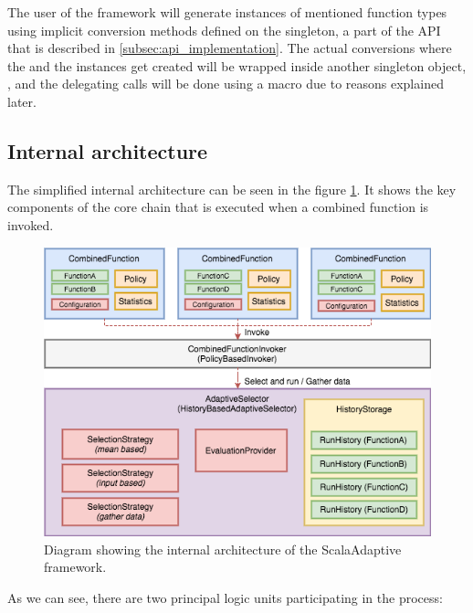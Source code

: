 The user of the framework will generate instances of mentioned function types using implicit conversion methods defined on the  singleton, a part of the API that is described in \ref{subsec:api_implementation}. The actual conversions where the  and the  instances get created will be wrapped inside another singleton object, , and the delegating calls will be done using a macro due to reasons explained later.

\subsection{Internal architecture}
\label{subsec:internal_architecture}

The simplified internal architecture can be seen in the figure \ref{fig:internal_architecture}. It shows the key components of the core chain that is executed when a combined function is invoked.

\begin{figure}[h!]
	\captionsetup{justification=centering,margin=0.5cm}
	\centerline{\mbox{\includegraphics[width=140mm]{./img/internal_architecture.png}}}
	\caption{Diagram showing the internal architecture of the ScalaAdaptive framework.}
	\label{fig:internal_architecture}
\end{figure}


As we can see, there are two principal logic units participating in the process:

